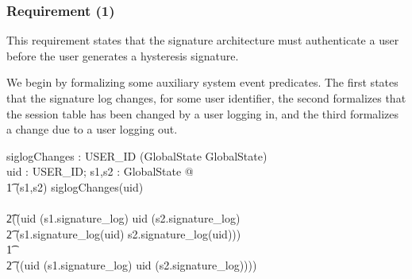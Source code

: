\documentclass[a4paper,pdftex]{article}
\begin{document}


\subsubsection{Requirement (1)}

This requirement states that the signature architecture must
authenticate a user before the user generates a hysteresis signature.

We begin by formalizing some auxiliary system event predicates.
The first states that the signature log changes, for some user
identifier, the second formalizes that the session table has been
changed by a user logging in, and the third formalizes a change due
to a user logging out.


\begin{axdef}
siglogChanges : USER\_ID \fun (GlobalState \rel GlobalState)                 \\
\where
\forall uid : USER\_ID; s1,s2 : GlobalState @                                \\
\t1 (s1,s2) \in siglogChanges(uid)                                           \\
\iff \\
\t2((uid \in \dom (s1.signature\_log) \land uid \in \dom (s2.signature\_log) \\
\t2   \land (s1.signature\_log(uid) \neq  s2.signature\_log(uid)))           \\
\t1 \lor                                                                     \\
\t2 ((uid \notin \dom (s1.signature\_log) \land uid \in \dom (s2.signature\_log))))
\end{axdef}
\end{document}
